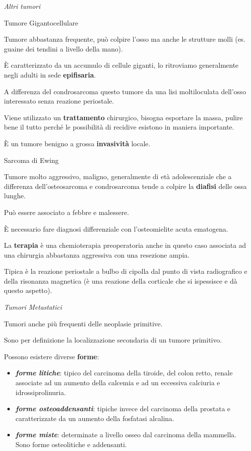 \emph{Altri tumori}

Tumore Gigantocellulare

Tumore abbastanza frequente, può colpire l'osso ma anche le strutture
molli (es. guaine dei tendini a livello della mano).

È caratterizzato da un accumulo di cellule giganti, lo ritroviamo
generalmente negli adulti in sede \textbf{epifisaria}.

A differenza del condrosarcoma questo tumore da una lisi moltiloculata
dell'osso interessato senza reazione periostale.

Viene utilizzato un \textbf{trattamento} chirurgico, bisogna esportare
la massa, pulire bene il tutto perché le possibilità di recidive
esistono in maniera importante.

È un tumore benigno a grossa \textbf{invasività} locale.

Sarcoma di Ewing

Tumore molto aggressivo, maligno, generalmente di età adolescenziale che
a differenza dell'osteosarcoma e condrosarcoma tende a colpire la
\textbf{diafisi} delle ossa lunghe.

Può essere associato a febbre e malessere.

È necessario fare diagnosi differenziale con l'osteomielite acuta
ematogena.

La \textbf{terapia} è una chemioterapia preoperatoria anche in questo
caso associata ad una chirurgia abbastanza aggressiva con una resezione
ampia.

Tipica è la reazione periostale a bulbo di cipolla dal punto di vista
radiografico e della risonanza magnetica (è una reazione della corticale
che si ispessisce e dà questo aspetto).

\emph{Tumori Metastatici}

Tumori anche più frequenti delle neoplasie primitive.

Sono per definizione la localizzazione secondaria di un tumore
primitivo.

Possono esistere diverse \textbf{forme}:

\begin{itemize}
\item
  \emph{\textbf{forme litiche}}: tipico del carcinoma della tiroide, del
  colon retto, renale associate ad un aumento della calcemia e ad un
  eccessiva calciuria e idrossiprolinuria.
\item
  \emph{\textbf{forme osteoaddensanti}}: tipiche invece del carcinoma
  della prostata e caratterizzate da un aumento della fosfatasi
  alcalina.
\item
  \emph{\textbf{forme miste}}: determinate a livello osseo dal carcinoma
  della mammella. Sono forme osteolitiche e addensanti.
\end{itemize}

